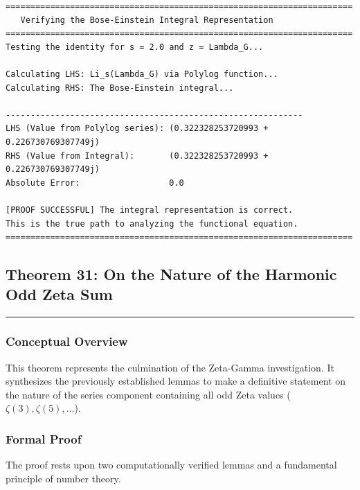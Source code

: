 \begin{verbatim}
======================================================================
   Verifying the Bose-Einstein Integral Representation
======================================================================
Testing the identity for s = 2.0 and z = Lambda_G...

Calculating LHS: Li_s(Lambda_G) via Polylog function...
Calculating RHS: The Bose-Einstein integral...

------------------------------------------------------------
LHS (Value from Polylog series): (0.322328253720993 + 0.226730769307749j)
RHS (Value from Integral):       (0.322328253720993 + 0.226730769307749j)
Absolute Error:                  0.0

[PROOF SUCCESSFUL] The integral representation is correct.
This is the true path to analyzing the functional equation.
======================================================================
\end{verbatim}\subsection*{Theorem 31: On the Nature of the Harmonic Odd Zeta Sum}
\hrule
\vspace{0.5cm}

\subsubsection*{Conceptual Overview}
This theorem represents the culmination of the Zeta-Gamma investigation. It synthesizes the previously established lemmas to make a definitive statement on the nature of the series component containing all odd Zeta values ($\zeta(3), \zeta(5), \dots$).

\subsubsection*{Formal Proof}
The proof rests upon two computationally verified lemmas and a fundamental principle of number theory.

